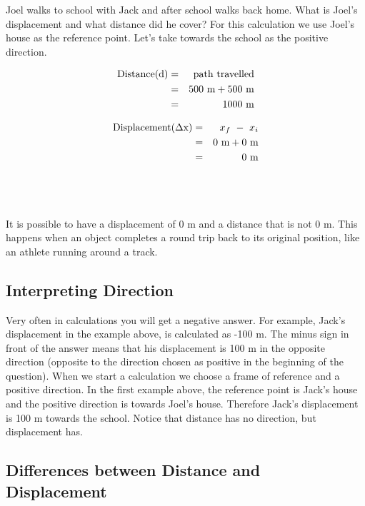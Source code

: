 Joel walks to school with Jack and after school walks back home. What is Joel's displacement and what distance did he cover?
For this calculation we use Joel's house as the reference point. Let's take towards the school as the positive direction. 

\begin{minipage}{0.5\textwidth}
\begin{eqnarray*}
\rm{Distance (d)} &=& \rm{path~travelled}\\
&=&500\ \mathrm{m} + 500\ \mathrm{m}\\
&=&1000\ \mathrm{m}
\end{eqnarray*}
\end{minipage}
\begin{minipage}{0.5\textwidth}
\begin{eqnarray*}
\rm{Displacement} (\Delta x) &=& x_f~ - ~ x_i\\
&=&0\ \mathrm{m} + 0\ \mathrm{m}\\
&=&0\ \mathrm{m}
\end{eqnarray*}
\end{minipage}
\\
\\
\\
It is possible to have a displacement of 0 m and a distance that is not 0 m. This happens when an object completes a round trip back to its original position, like an athlete running around a track.

\subsection{Interpreting Direction}
Very often in calculations you will get a negative answer. For example, Jack's displacement in the example above, is calculated as -100 m. The minus sign in front of the answer means that his displacement is 100 m in the opposite direction (opposite to the direction chosen as positive in the beginning of the question). When we start a calculation we choose a frame of reference and a positive direction. In the first example above, the reference point is Jack's house and the positive direction is towards Joel's house. Therefore Jack's displacement is 100 m towards the school. Notice that distance has no direction, but displacement has.



\subsection{Differences between Distance and Displacement}

